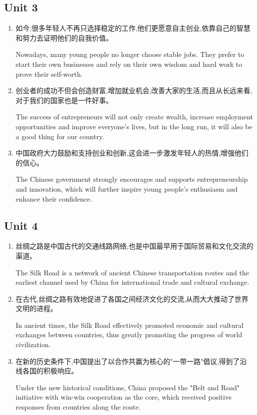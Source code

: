 \subsection{Unit 3}
\begin{enumerate}
	\item 如今,很多年轻人不再只选择稳定的工作,他们更愿意自主创业,依靠自己的智慧和努力去证明他们的自我价值。
	
	Nowadays, many young people no longer choose stable jobs. They prefer to start their own businesses and rely on their own wisdom and hard work to prove their self-worth.
	
	\item 创业者的成功不但会创造财富,增加就业机会,改善大家的生活,而且从长远来看,对于我们的国家也是一件好事。
	
	The success of entrepreneurs will not only create wealth, increase employment opportunities and improve everyone's lives, but in the long run, it will also be a good thing for our country.
	
	\item 中国政府大力鼓励和支持创业和创新,这会进一步激发年轻人的热情,增强他们的信心。
	
	The Chinese government strongly encourages and supports entrepreneurship and innovation, which will further inspire young people's enthusiasm and enhance their confidence.
	
\end{enumerate}



\subsection{Unit 4}
\begin{enumerate}
	\item 丝绸之路是中国古代的交通线路网络,也是中国最早用于国际贸易和文化交流的渠道。
	
	The Silk Road is a network of ancient Chinese transportation routes and the earliest channel used by China for international trade and cultural exchange.
	
	\item 在古代,丝绸之路有效地促进了各国之间经济文化的交流,从而大大推动了世界文明的进程。
	
	In ancient times, the Silk Road effectively promoted economic and cultural exchanges between countries, thus greatly promoting the progress of world civilization.
	
	\item 在新的历史条件下,中国提出了以合作共赢为核心的"一带一路"倡议,得到了沿线各国的积极响应。
	
	Under the new historical conditions, China proposed the "Belt and Road" initiative with win-win cooperation as the core, which received positive responses from countries along the route.
	
\end{enumerate}


